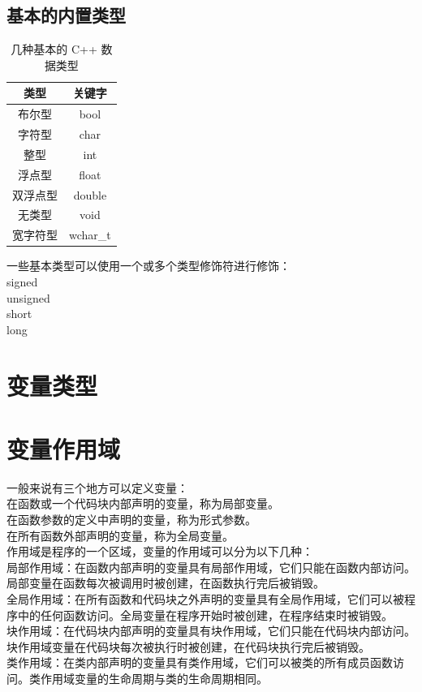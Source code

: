 \documentclass[12pt,twiside,a4paper]{ctexbook}
\numberwithin{chapter}{part}
\begin{document}
\section{基本的内置类型}
\begin{table}[h]
    \centering
    \caption{几种基本的 C++ 数据类型}
    \label{tab:example}
    \begin{tabular}{|c|c|}
    \hline
    \textbf{类型} & \textbf{关键字}\\
    \hline
    布尔型 & bool\\
    \hline
    字符型 & char\\
    \hline
    整型 & int\\
    \hline
    浮点型 & float\\
    \hline
    双浮点型 & double\\
    \hline
    无类型 & void\\
    \hline
    宽字符型 & wchar\_t\\
    \hline
    \end{tabular}
\end{table}
一些基本类型可以使用一个或多个类型修饰符进行修饰：\\
signed\\
unsigned\\
short\\
long\\


\chapter{变量类型}

\chapter{变量作用域}
一般来说有三个地方可以定义变量：\\
在函数或一个代码块内部声明的变量，称为局部变量。\\
在函数参数的定义中声明的变量，称为形式参数。\\
在所有函数外部声明的变量，称为全局变量。\\
作用域是程序的一个区域，变量的作用域可以分为以下几种：\\
局部作用域：在函数内部声明的变量具有局部作用域，它们只能在函数内部访问。局部变量在函数每次被调用时被创建，在函数执行完后被销毁。\\
全局作用域：在所有函数和代码块之外声明的变量具有全局作用域，它们可以被程序中的任何函数访问。全局变量在程序开始时被创建，在程序结束时被销毁。\\
块作用域：在代码块内部声明的变量具有块作用域，它们只能在代码块内部访问。块作用域变量在代码块每次被执行时被创建，在代码块执行完后被销毁。\\
类作用域：在类内部声明的变量具有类作用域，它们可以被类的所有成员函数访问。类作用域变量的生命周期与类的生命周期相同。
\end{document}

